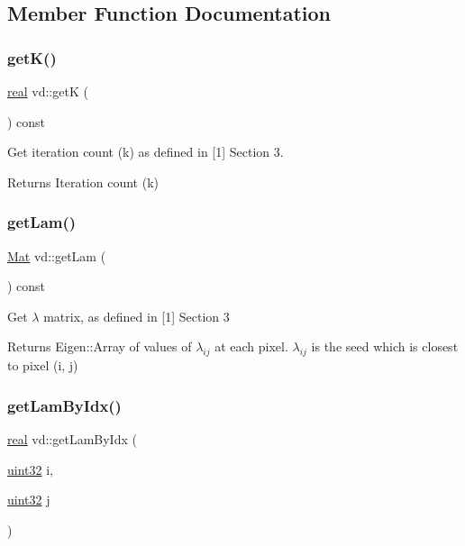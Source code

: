 \subsection{Member Function Documentation}
\mbox{\label{classvd_a624f53ae4a7012f267111359e9245f81}} 
\subsubsection{\texorpdfstring{get\+K()}{getK()}}
{\footnotesize\ttfamily \mbox{\hyperlink{typedefs_8cpp_a58a0c7cf2501f4492da833421be92547}{real}} vd\+::getK (\begin{DoxyParamCaption}{ }\end{DoxyParamCaption}) const}

Get iteration count (k) as defined in \mbox{[}1\mbox{]} Section 3. \begin{DoxyReturn}{Returns}
Iteration count (k) 
\end{DoxyReturn}
\mbox{\label{classvd_a37c4ab12669eb276fe7fa4a610310345}} 
\subsubsection{\texorpdfstring{get\+Lam()}{getLam()}}
{\footnotesize\ttfamily \mbox{\hyperlink{typedefs_8cpp_a9fa28c1f74e909474857584f5c7b0088}{Mat}} vd\+::get\+Lam (\begin{DoxyParamCaption}{ }\end{DoxyParamCaption}) const}

Get $\lambda$ matrix, as defined in \mbox{[}1\mbox{]} Section 3 \begin{DoxyReturn}{Returns}
Eigen\+::\+Array of values of $\lambda_{ij}$ at each pixel. $\lambda_{ij}$ is the seed which is closest to pixel (i, j) 
\end{DoxyReturn}
\mbox{\label{classvd_ae0ec132e647b7d9662bf2bfbf95e7297}} 
\subsubsection{\texorpdfstring{get\+Lam\+By\+Idx()}{getLamByIdx()}}
{\footnotesize\ttfamily \mbox{\hyperlink{typedefs_8cpp_a58a0c7cf2501f4492da833421be92547}{real}} vd\+::get\+Lam\+By\+Idx (\begin{DoxyParamCaption}\item[{\mbox{\hyperlink{typedefs_8cpp_a8ad23e2333787a214e20a58a284a5a60}{uint32}}}]{i,  }\item[{\mbox{\hyperlink{typedefs_8cpp_a8ad23e2333787a214e20a58a284a5a60}{uint32}}}]{j }\end{DoxyParamCaption})}

